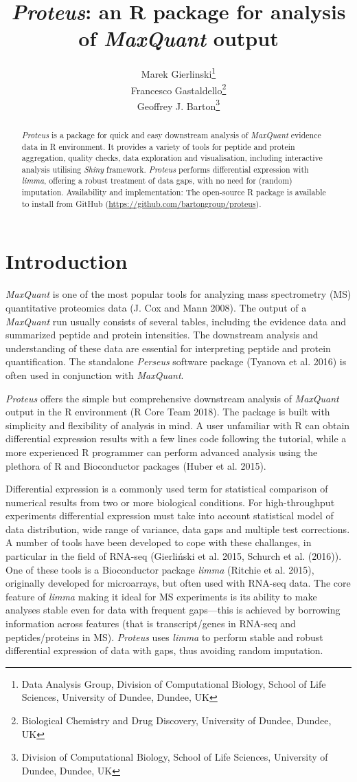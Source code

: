 \documentclass[]{article}
\title{\emph{Proteus}: an R package for analysis of \emph{MaxQuant} output}
\author{Marek Gierlinski\footnote{Data Analysis Group, Division of Computational
  Biology, School of Life Sciences, University of Dundee, Dundee, UK} \\ Francesco Gastaldello\footnote{Biological Chemistry and Drug Discovery,
  University of Dundee, Dundee, UK} \\ Geoffrey J. Barton\footnote{Division of Computational Biology, School of
  Life Sciences, University of Dundee, Dundee, UK}}
\date{}
\begin{document}
\maketitle
\begin{abstract}
\emph{Proteus} is a package for quick and easy downstream analysis of
\emph{MaxQuant} evidence data in R environment. It provides a variety of
tools for peptide and protein aggregation, quality checks, data
exploration and visualisation, including interactive analysis utilising
\emph{Shiny} framework. \emph{Proteus} performs differential expression
with \emph{limma}, offering a robust treatment of data gaps, with no
need for (random) imputation. Availability and implementation: The
open-source R package is available to install from GitHub
(\url{https://github.com/bartongroup/proteus}).
\end{abstract}

\section{Introduction}\label{introduction}

\emph{MaxQuant} is one of the most popular tools for analyzing mass
spectrometry (MS) quantitative proteomics data (J. Cox and Mann 2008).
The output of a \emph{MaxQuant} run usually consists of several tables,
including the evidence data and summarized peptide and protein
intensities. The downstream analysis and understanding of these data are
essential for interpreting peptide and protein quantification. The
standalone \emph{Perseus} software package (Tyanova et al. 2016) is
often used in conjunction with \emph{MaxQuant}.

\emph{Proteus} offers the simple but comprehensive downstream analysis
of \emph{MaxQuant} output in the R environment (R Core Team 2018). The
package is built with simplicity and flexibility of analysis in mind. A
user unfamiliar with R can obtain differential expression results with a
few lines code following the tutorial, while a more experienced R
programmer can perform advanced analysis using the plethora of R and
Bioconductor packages (Huber et al. 2015).

Differential expression is a commonly used term for statistical
comparison of numerical results from two or more biological conditions.
For high-throughput experiments differential expression must take into
account statistical model of data distribution, wide range of variance,
data gaps and multiple test corrections. A number of tools have been
developed to cope with these challanges, in particular in the field of
RNA-seq (Gierliński et al. 2015, Schurch et al. (2016)). One of these
tools is a Bioconductor package \emph{limma} (Ritchie et al. 2015),
originally developed for microarrays, but often used with RNA-seq data.
The core feature of \emph{limma} making it ideal for MS experiments is
its ability to make analyses stable even for data with frequent
gaps---this is achieved by borrowing information across features (that
is transcript/genes in RNA-seq and peptides/proteins in MS).
\emph{Proteus} uses \emph{limma} to perform stable and robust
differential expression of data with gaps, thus avoiding random
imputation.
\end{document}
